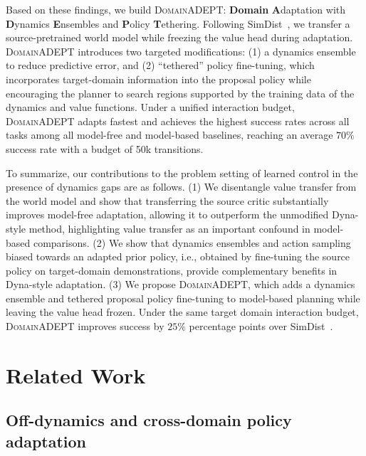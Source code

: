 \documentclass{article} %
\newcommand{\DomainADEPT}{\textsc{DomainADEPT}\xspace}
\begin{document}
Based on these findings, we build \DomainADEPT: \textbf{Domain} \textbf{A}daptation with \textbf{D}ynamics \textbf{E}nsembles and \textbf{P}olicy \textbf{T}ethering. Following SimDist~\citep{levy2026simulation}, we transfer a source-pretrained world model while freezing the value head during adaptation. \DomainADEPT introduces two targeted modifications: (1) a dynamics ensemble to reduce predictive error, and (2) ``tethered'' policy fine-tuning, which incorporates target-domain information into the proposal policy while encouraging the planner to search regions supported by the training data of the dynamics and value functions. Under a unified interaction budget, \DomainADEPT adapts fastest and achieves the highest success rates across all tasks among all model-free and model-based baselines, reaching an average $70\%$ success rate with a budget of 50k transitions.

To summarize, our contributions to the problem setting of learned control in the presence of dynamics gaps are as follows. (1) We disentangle value transfer from the world model and show that transferring the source critic substantially improves model-free adaptation, allowing it to outperform the unmodified Dyna-style method, highlighting value transfer as an important confound in model-based comparisons.
(2) We show that dynamics ensembles and action sampling biased towards an adapted prior policy, i.e., obtained by fine-tuning the source policy on target-domain demonstrations, provide complementary benefits in Dyna-style adaptation.
(3) We propose \DomainADEPT, which adds a dynamics ensemble and tethered proposal policy fine-tuning to model-based planning while leaving the value head frozen. Under the same target domain interaction budget, \DomainADEPT improves success by $25\%$ percentage points over SimDist~\citep{levy2026simulation}. 

\section{Related Work}
\label{relatedwork}

\subsection{Off-dynamics and cross-domain policy adaptation}
\label{sec:rela-sim2real}
\end{document}
